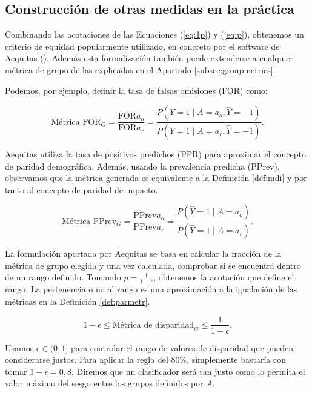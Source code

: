\documentclass[oneside,openright,titlepage,numbers=noenddot,openany,headinclude,footinclude=true,
cleardoublepage=empty,abstractoff,BCOR=5mm,paper=a4,fontsize=12pt,main=spanish]{scrreprt}
\begin{document}
\subsection*{Construcción de otras medidas en la práctica}

Combinando las acotaciones de las Ecuaciones (\ref{eq:1p}) y (\ref{eq:p}), obtenemos un criterio de equidad popularmente utilizado, en concreto por el software de Aequitas (\cite{aequitasdoc}). Además esta formalización también puede extenderse a cualquier métrica de grupo de las explicadas en el Apartado \ref{subsec:groupmetrics}.

Podemos, por ejemplo, definir la tasa de falsas omisiones (FOR) como:

\begin{equation*} 
\text{Métrica FOR}_G =\frac{\text{FOR}{a_o}}{\text{FOR}{a_r}}=\frac{P(Y=1 \mid A=a_o, \hat{Y}=-1)}{P(Y=1 \mid A=a_r, \hat{Y}=-1)}.
\end{equation*}

Aequitas utiliza la tasa de positivos predichos (PPR) para aproximar el concepto de paridad demográfica. Además, usando la prevalencia predicha (PPrev), observamos que la métrica generada es equivalente a la Definición \ref{def:mdi} y por tanto al concepto de paridad de impacto.

\begin{equation*} 
\text{Métrica PPrev}_G=\frac{\text{PPrev}{a_o}}{\text{PPrev}{a_r}}=\frac{P(\hat{Y}=1 \mid A=a_o)}{P(\hat{Y}=1 \mid A=a_r)}.
\end{equation*}

La formulación aportada por Aequitas se basa en calcular la fracción de la métrica de grupo elegida y una vez calculada, comprobar si se encuentra dentro de un rango definido. Tomando $p=\frac{1}{1-\epsilon}$, obtenemos la acotación que define el rango. La pertenencia o no al rango es una aproximación a la igualación de las métricas en la Definición \ref{def:parmetr}.

\begin{equation}
1-\epsilon \leq \text{Métrica de disparidad}_{G} \leq \frac{1}{1-\epsilon}.
\end{equation}

Usamos $\epsilon \in
(0,1]$ para controlar el rango de valores de disparidad que pueden considerarse justos. Para aplicar la regla del 80\%, simplemente bastaría con tomar $1-\epsilon=0,8$. Diremos que un clasificador será tan justo como lo permita el valor máximo del sesgo entre los grupos definidos por $A$. 
\end{document}
